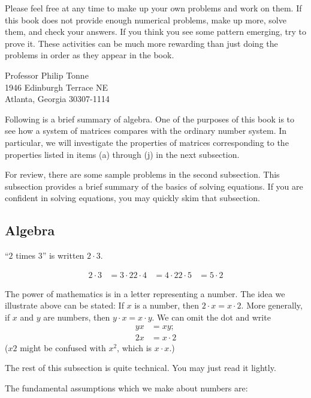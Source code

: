 \documentclass{article}
\begin{document}
Please feel free at any time to make up your own problems and work on them. If this book does not provide enough numerical problems, make up more, solve them, and check your answers. If you think you see some pattern emerging, try to prove it. These activities can be much more rewarding than just doing the problems in order as they appear in the book.

\begin{flushright}
Professor Philip Tonne
\\ 1946 Edinburgh Terrace NE
\\ Atlanta, Georgia 30307-1114
\end{flushright}


\newpage

Following is a brief summary of algebra. One of the purposes of this book is to see how a system of matrices compares with the ordinary number system. In particular, we will investigate the properties of matrices corresponding to the properties listed in items (a) through (j) in the next subsection.

For review, there are some sample problems in the second subsection. This subsection provides a brief summary of the basics of solving equations. If you are confident in solving equations, you may quickly skim that subsection.


\subsection{Algebra}

``$2$ times $3$'' is written $2 \cdot 3$.

\begin{align*}
2 \cdot 3 & = 3 \cdot 2
2 \cdot 4 & = 4 \cdot 2
2 \cdot 5 & = 5 \cdot 2
\end{align*}

The power of mathematics is in a letter representing a number. The idea we illustrate above can be stated: If $x$ is a number, then $2 \cdot x = x \cdot 2$. More generally, if $x$ and $y$ are numbers, then $y \cdot x = x \cdot y$. We can omit the dot and write
\begin{align*}
yx & = xy; \\
2x & = x \cdot 2
\end{align*}
($x2$ might be confused with $x^2$, which is $x \cdot x$.)

The rest of this subsection is quite technical. You may just read it lightly.

The fundamental assumptions which we make about numbers are:
\end{document}
